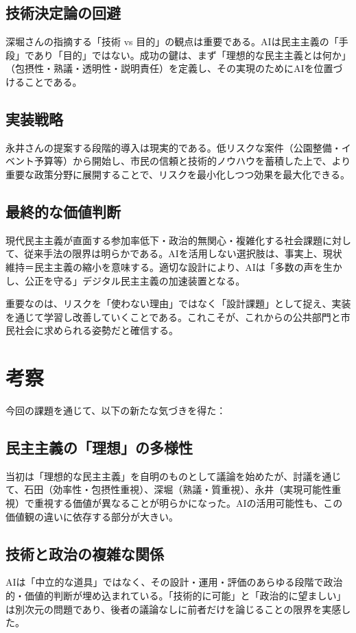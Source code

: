 \documentclass[12pt,a4j]{jarticle}
\begin{document}
\subsection{技術決定論の回避}
深堀さんの指摘する「技術 vs 目的」の観点は重要である。AIは民主主義の「手段」であり「目的」ではない。成功の鍵は、まず「理想的な民主主義とは何か」（包摂性・熟議・透明性・説明責任）を定義し、その実現のためにAIを位置づけることである。

\subsection{実装戦略}
永井さんの提案する段階的導入は現実的である。低リスクな案件（公園整備・イベント予算等）から開始し、市民の信頼と技術的ノウハウを蓄積した上で、より重要な政策分野に展開することで、リスクを最小化しつつ効果を最大化できる。

\subsection{最終的な価値判断}
現代民主主義が直面する参加率低下・政治的無関心・複雑化する社会課題に対して、従来手法の限界は明らかである。AIを活用しない選択肢は、事実上、現状維持＝民主主義の縮小を意味する。適切な設計により、AIは「多数の声を生かし、公正を守る」デジタル民主主義の加速装置となる\cite{oecd2025}。

重要なのは、リスクを「使わない理由」ではなく「設計課題」として捉え、実装を通じて学習し改善していくことである。これこそが、これからの公共部門と市民社会に求められる姿勢だと確信する。

\section{考察}

今回の課題を通じて、以下の新たな気づきを得た：

\subsection{民主主義の「理想」の多様性}
当初は「理想的な民主主義」を自明のものとして議論を始めたが、討議を通じて、石田（効率性・包摂性重視）、深堀（熟議・質重視）、永井（実現可能性重視）で重視する価値が異なることが明らかになった。AIの活用可能性も、この価値観の違いに依存する部分が大きい。

\subsection{技術と政治の複雑な関係}
AIは「中立的な道具」ではなく、その設計・運用・評価のあらゆる段階で政治的・価値的判断が埋め込まれている。「技術的に可能」と「政治的に望ましい」は別次元の問題であり、後者の議論なしに前者だけを論じることの限界を実感した。
\end{document}
